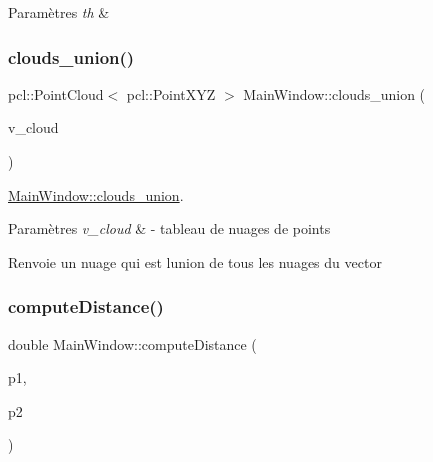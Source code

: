 \begin{DoxyParams}{Paramètres}
{\em th} & \\
\hline
\end{DoxyParams}
\mbox{\label{classMainWindow_a419bc39129027cc42b708751088cbde7}} 
\subsubsection{\texorpdfstring{clouds\+\_\+union()}{clouds\_union()}}
{\footnotesize\ttfamily pcl\+::\+Point\+Cloud$<$ pcl\+::\+Point\+X\+YZ $>$ Main\+Window\+::clouds\+\_\+union (\begin{DoxyParamCaption}\item[{std\+::vector$<$ pcl\+::\+Point\+Cloud$<$ pcl\+::\+Point\+X\+YZ $>$$>$}]{v\+\_\+cloud }\end{DoxyParamCaption})}



\hyperlink{classMainWindow_a419bc39129027cc42b708751088cbde7}{Main\+Window\+::clouds\+\_\+union}. 


\begin{DoxyParams}{Paramètres}
{\em v\+\_\+cloud} & -\/ tableau de nuages de points \\
\hline
\end{DoxyParams}
\begin{DoxyReturn}{Renvoie}
un nuage qui est l\textquotesingle{}union de tous les nuages du vector 
\end{DoxyReturn}
\mbox{\label{classMainWindow_a5cf7c81626d682f087f5143605342f52}} 
\subsubsection{\texorpdfstring{compute\+Distance()}{computeDistance()}}
{\footnotesize\ttfamily double Main\+Window\+::compute\+Distance (\begin{DoxyParamCaption}\item[{Q\+Vector3D}]{p1,  }\item[{Q\+Vector3D}]{p2 }\end{DoxyParamCaption})}



